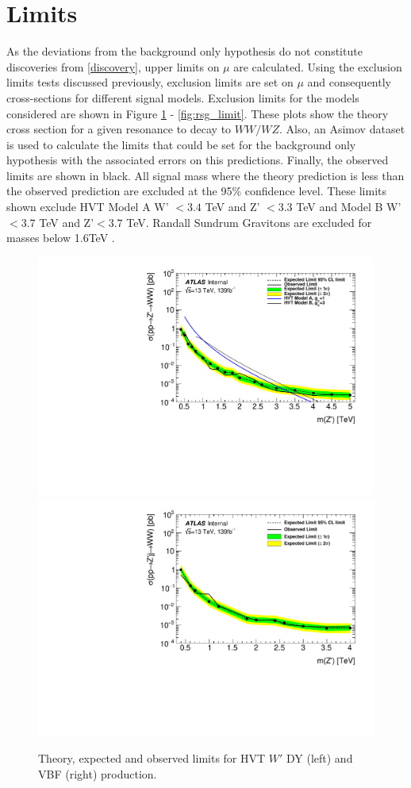 \section{Limits}
As the deviations from the background only hypothesis do not constitute discoveries from \ref{discovery}, upper limits on $\mu$ are calculated. Using the exclusion limits tests discussed previously, exclusion limits are set on $\mu$ and consequently cross-sections for different signal models. Exclusion limits for the models considered are shown in Figure \ref{fig:hvtww_limit} - \ref{fig:rsg_limit}. These plots show the theory cross section for a given resonance to decay to $WW/WZ$. Also, an Asimov dataset is used to calculate the limits that could be set for the background only hypothesis with the associated errors on this predictions. Finally, the observed limits are shown in black. All signal mass where the theory prediction is less than the observed prediction are excluded at the 95\% confidence level. These limits shown exclude HVT Model A W' $< 3.4$ TeV and Z' $< 3.3$ TeV and Model B W' $< 3.7$ TeV and Z'$ < 3.7$ TeV. Randall Sundrum Gravitons are excluded for masses below 1.6TeV .


\begin{figure}[h!]
  \centering
  \includegraphics[width=0.48\hsize]{figures/results/limits/limits_hvtww.pdf}
  \includegraphics[width=0.48\hsize]{figures/results/limits/limits_hvtwwvbf.pdf}

 \caption{Theory, expected and observed limits for HVT $W'$ DY (left) and VBF (right) production.}
  \label{fig:hvtww_limit}
\end{figure} 
\FloatBarrier


